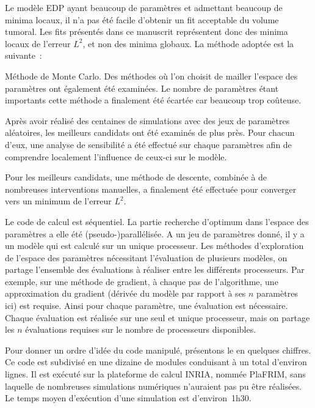 \documentclass[main.tex]{subfiles}
\begin{document}
Le modèle EDP ayant beaucoup de paramètres et admettant beaucoup de minima locaux, il n'a pas été facile d'obtenir un fit acceptable du volume tumoral. Les fits présentés dans ce manuscrit représentent  donc des minima locaux de l'erreur $L^2$, et non des minima globaux. La méthode adoptée est la suivante~: 
\begin{myenumerate}
\item Méthode de Monte Carlo. Des méthodes où l'on choisit de mailler l'espace des paramètres ont également été examinées. Le nombre de paramètres étant importants cette méthode a finalement été écartée car beaucoup trop coûteuse. 
\item Après avoir réalisé des centaines de simulations avec des jeux de paramètres aléatoires, les meilleurs candidats ont été examinés de plus près. Pour chacun d'eux, une analyse de sensibilité a été effectué sur chaque paramètres afin de comprendre localement l'influence de ceux-ci sur le modèle.
\item Pour les meilleurs candidats, une méthode de descente, combinée à de nombreuses interventions manuelles, a finalement été effectuée pour converger vers un minimum de l'erreur $L^2$. 
\end{myenumerate}


Le code de calcul est séquentiel. La partie recherche d'optimum dans l'espace des paramètres a elle été (pseudo-)parallélisée. A un jeu de paramètres donné, il y a un modèle qui est calculé sur un unique processeur. Les méthodes d'exploration de l'espace des paramètres nécessitant l'évaluation de plusieurs modèles, on partage l'ensemble des évaluations à réaliser entre les différents processeurs. Par exemple, sur une méthode de gradient, à chaque pas de l'algorithme, une approximation du gradient (dérivée du modèle par rapport à ses $n$ paramètres ici) est requise. Ainsi pour chaque paramètre, une évaluation est nécessaire. Chaque évaluation est réalisée sur une seul et unique processeur, mais on partage les $n$ évaluations requises sur le nombre de processeurs disponibles.


Pour donner un ordre d'idée du code manipulé, présentons le en quelques chiffres. Ce code est subdivisé en une dizaine de modules conduisant à un total d'environ  lignes. Il est exécuté sur la plateforme de calcul INRIA, nommée PlaFRIM, sans laquelle de nombreuses simulations numériques n'auraient pas pu être réalisées. Le temps moyen d'exécution d'une simulation est d'environ~1h30. 
\end{document}
